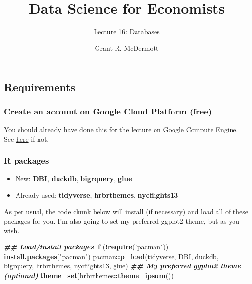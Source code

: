 \documentclass[
]{article}
\title{Data Science for Economists}
\subtitle{Lecture 16: Databases}
\author[]{Grant R. McDermott}
\affil{University
of Oregon \textbar{} \href{https://github.com/uo-ec607/lectures}{EC
607}}
\date{}
\newenvironment{Shaded}{\begin{snugshade}}{\end{snugshade}}
\newcommand{\ControlFlowTok}[1]{\textcolor[rgb]{0.13,0.29,0.53}{\textbf{#1}}}
\newcommand{\DocumentationTok}[1]{\textcolor[rgb]{0.56,0.35,0.01}{\textbf{\textit{#1}}}}
\newcommand{\FunctionTok}[1]{\textcolor[rgb]{0.13,0.29,0.53}{\textbf{#1}}}
\newcommand{\NormalTok}[1]{#1}
\newcommand{\SpecialCharTok}[1]{\textcolor[rgb]{0.81,0.36,0.00}{\textbf{#1}}}
\newcommand{\StringTok}[1]{\textcolor[rgb]{0.31,0.60,0.02}{#1}}
\providecommand{\tightlist}{%
  \setlength{\itemsep}{0pt}\setlength{\parskip}{0pt}}
\begin{document}
\maketitle

{
\hypersetup{linkcolor=}
\setcounter{tocdepth}{2}
\tableofcontents
}
\hypertarget{requirements}{%
\subsection{Requirements}\label{requirements}}

\hypertarget{create-an-account-on-google-cloud-platform-free}{%
\subsubsection{Create an account on Google Cloud Platform
(free)}\label{create-an-account-on-google-cloud-platform-free}}

You should already have done this for the lecture on Google Compute
Engine. See
\href{https://raw.githack.com/uo-ec607/lectures/master/14-gce-i/14-gce-i.html\#Create_an_account_on_Google_Cloud_Platform_(free)}{here}
if not.

\hypertarget{r-packages}{%
\subsubsection{R packages}\label{r-packages}}

\begin{itemize}
\tightlist
\item
  New: \textbf{DBI}, \textbf{duckdb}, \textbf{bigrquery}, \textbf{glue}
\item
  Already used: \textbf{tidyverse}, \textbf{hrbrthemes},
  \textbf{nycflights13}
\end{itemize}

As per usual, the code chunk below will install (if necessary) and load
all of these packages for you. I'm also going to set my preferred
ggplot2 theme, but as you wish.

\begin{Shaded}
\begin{Highlighting}[]
\DocumentationTok{\#\# Load/install packages}
\ControlFlowTok{if}\NormalTok{ (}\SpecialCharTok{!}\FunctionTok{require}\NormalTok{(}\StringTok{"pacman"}\NormalTok{)) }\FunctionTok{install.packages}\NormalTok{(}\StringTok{"pacman"}\NormalTok{)}
\NormalTok{pacman}\SpecialCharTok{::}\FunctionTok{p\_load}\NormalTok{(tidyverse, DBI, duckdb, bigrquery, hrbrthemes, nycflights13, glue)}
\DocumentationTok{\#\# My preferred ggplot2 theme (optional)}
\FunctionTok{theme\_set}\NormalTok{(hrbrthemes}\SpecialCharTok{::}\FunctionTok{theme\_ipsum}\NormalTok{())}
\end{Highlighting}
\end{Shaded}
\end{document}
